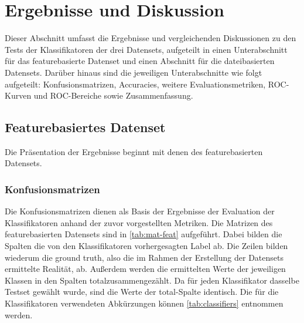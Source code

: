 \section{Ergebnisse und Diskussion}
\label{results}

Dieser Abschnitt umfasst die Ergebnisse und vergleichenden Diskussionen zu den Tests der Klassifikatoren der drei Datensets, aufgeteilt in einen Unterabschnitt für das featurebasierte Datenset und einen Abschnitt für die dateibasierten Datensets. Darüber hinaus sind die jeweiligen Unterabschnitte wie folgt aufgeteilt: Konfusionsmatrizen, Accuracies, weitere Evaluationsmetriken, ROC-Kurven und ROC-Bereiche sowie Zusammenfassung.

\subsection{Featurebasiertes Datenset}

Die Präsentation der Ergebnisse beginnt mit denen des featurebasierten Datensets.

\subsubsection*{Konfusionsmatrizen}

Die Konfusionsmatrizen dienen als Basis der Ergebnisse der Evaluation der Klassifikatoren anhand der zuvor vorgestellten Metriken. Die Matrizen des featurebasierten Datensets sind in \autoref{tab:mat-feat} aufgeführt. Dabei bilden die Spalten die von den Klassifikatoren vorhergesagten Label ab. Die Zeilen bilden wiederum die \glqq ground truth\grqq{}, also die im Rahmen der Erstellung der Datensets ermittelte Realität, ab. Außerdem werden die ermittelten Werte der jeweiligen Klassen in den Spalten \glqq total\grqq zusammengezählt. Da für jeden Klassifikator dasselbe Testset gewählt wurde, sind die Werte der \glqq total\grqq-Spalte identisch. Die für die Klassifikatoren verwendeten Abkürzungen können \autoref{tab:classifiers} entnommen werden.

